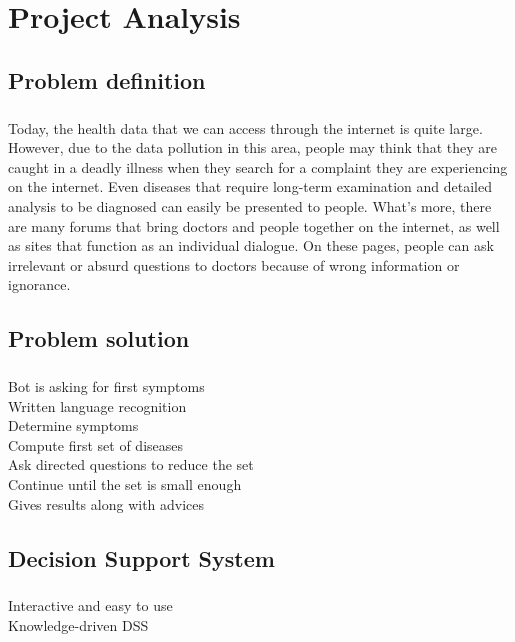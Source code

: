 \chapter{Project Analysis} %

\section{Problem definition}

\paragraph{}
Today, the health data that we can access through the internet is quite large. However, due to the data pollution in this area, people may think that they are	caught	in	a	deadly	illness when	they	search	for	a	complaint	they	are	experiencing	on	the	internet.	Even	diseases	that require	long-term	examination	and	detailed	analysis	to	be	diagnosed	can	easily	be	presented to	people.	What's	more,	there	are	many	forums	that	bring	doctors	and	people	together	on	the	internet,	as	well	as	sites	that	function	as	an	individual	dialogue.	On	these	pages,	people	can	ask	irrelevant	or	absurd	questions	to	doctors	because	of	wrong	information	or	ignorance. 

\section{Problem solution}

\paragraph{}
Bot is asking for first symptoms \\
Written language recognition \\
Determine symptoms \\
Compute first set of diseases \\
Ask directed questions to reduce the set \\
Continue until the set is small enough \\
Gives results along with advices 

\section{Decision Support System}

\paragraph{}
Interactive and easy to use \\
Knowledge-driven DSS

